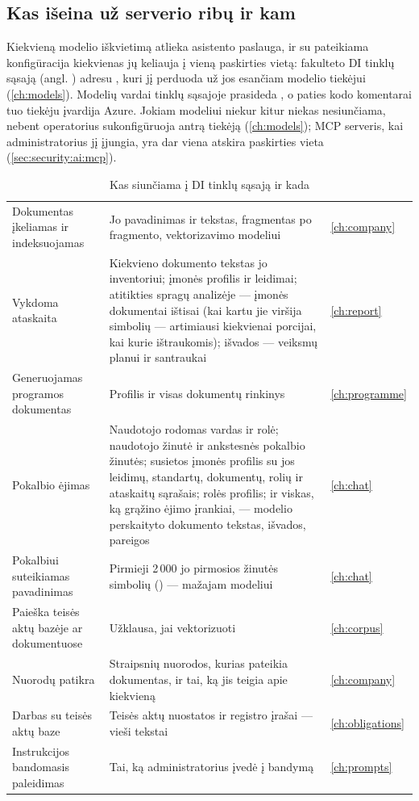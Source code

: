 \subsection{Kas išeina už serverio ribų ir kam}\label{sec:security:ai:leaves}

Kiekvieną modelio iškvietimą atlieka asistento paslauga, ir su pateikiama konfigūracija
kiekvienas jų keliauja į vieną paskirties vietą: fakulteto DI tinklų sąsają (angl.
) adresu , kuri jį perduoda už jos esančiam modelio tiekėjui
(\cref{ch:models}). Modelių vardai tinklų sąsajoje prasideda , o paties kodo
komentarai tuo tiekėju įvardija Azure. Jokiam modeliui niekur kitur niekas nesiunčiama, nebent
operatorius sukonfigūruoja antrą tiekėją (\cref{ch:models}); MCP serveris, kai
administratorius jį įjungia, yra dar viena atskira paskirties vieta
(\cref{sec:security:ai:mcp}).

\begin{table}[H]
\caption{Kas siunčiama į DI tinklų sąsają ir kada}\label{tab:security:leaves}
\begin{tabularx}{\textwidth}{@{}L{43mm}Yl@{}}
\toprule
{} &  &  \\
\midrule
Dokumentas įkeliamas ir indeksuojamas & Jo pavadinimas ir tekstas, fragmentas po fragmento, vektorizavimo modeliui & \cref{ch:company} \\
Vykdoma ataskaita & Kiekvieno dokumento tekstas jo inventoriui; įmonės profilis ir leidimai; atitikties spragų analizėje --- įmonės dokumentai ištisai (kai kartu jie viršija  \code{=}  simbolių --- artimiausi kiekvienai porcijai, kai kurie ištraukomis); išvados --- veiksmų planui ir santraukai & \cref{ch:report} \\
Generuojamas programos dokumentas & Profilis ir visas dokumentų rinkinys & \cref{ch:programme} \\
Pokalbio ėjimas & Naudotojo rodomas vardas ir rolė; naudotojo žinutė ir ankstesnės pokalbio žinutės; susietos įmonės profilis su jos leidimų, standartų, dokumentų, rolių ir ataskaitų sąrašais; rolės profilis; ir viskas, ką grąžino ėjimo įrankiai, --- modelio perskaityto dokumento tekstas, išvados, pareigos & \cref{ch:chat} \\
Pokalbiui suteikiamas pavadinimas & Pirmieji 2\,000 jo pirmosios žinutės simbolių () --- mažajam modeliui & \cref{ch:chat} \\
Paieška teisės aktų bazėje ar dokumentuose & Užklausa, jai vektorizuoti & \cref{ch:corpus} \\
Nuorodų patikra & Straipsnių nuorodos, kurias pateikia dokumentas, ir tai, ką jis teigia apie kiekvieną & \cref{ch:company} \\
Darbas su teisės aktų baze & Teisės aktų nuostatos ir registro įrašai --- vieši tekstai & \cref{ch:obligations} \\
Instrukcijos bandomasis paleidimas & Tai, ką administratorius įvedė į bandymą & \cref{ch:prompts} \\
\bottomrule
\end{tabularx}
\end{table}

